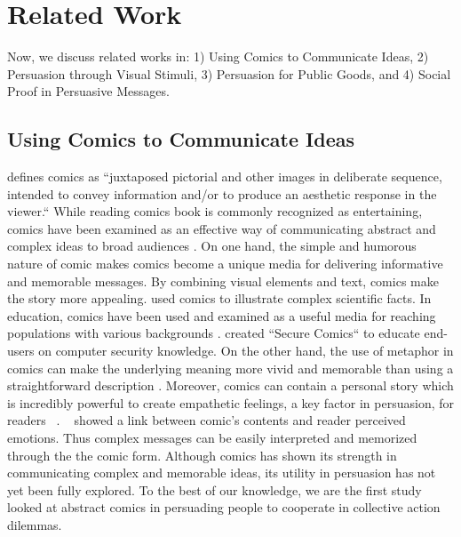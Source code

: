 \section{Related Work}
\label{sec:relatedwork}
Now, we discuss related works in: 1) Using Comics to Communicate Ideas, 2) Persuasion through Visual Stimuli, 3) Persuasion for Public Goods, and 4) Social Proof in Persuasive Messages.

\subsection{Using Comics to Communicate Ideas}
\textcite{scott1993understanding} defines comics as ``juxtaposed pictorial and other images in deliberate sequence, intended to convey information and/or to produce an aesthetic response in the viewer.`` While reading comics book is commonly recognized as entertaining, comics have been examined as an effective way of communicating abstract and complex ideas to broad audiences \cite{McDermottPB18,cary2004going,scott1993understanding, Zhang-Kennedy:2017:SCI:3206217.3206282}. On one hand, the simple and humorous nature of comic makes comics become a unique media for delivering informative and memorable messages. By combining visual elements and text, comics make the story more appealing. \textcite{McDermottPB18} used comics to illustrate complex scientific facts. In education, comics have been used and examined as a useful media for reaching populations with various backgrounds \cite{McDermottPB18,cary2004going,scott1993understanding}. \textcite{Zhang-Kennedy:2017:SCI:3206217.3206282} created ``Secure Comics`` to educate end-users on computer security knowledge. On the other hand, the use of metaphor in comics can make the underlying meaning more vivid and memorable than using a straightforward description \cite{McDermottPB18,scott1993understanding}. Moreover, comics can contain a personal story which is incredibly powerful to create empathetic feelings, a key factor in persuasion, for readers ~\cite{weaver2017losing}. ~\textcite{matsubara2016emotional} showed a link between  comic's contents and reader perceived emotions. Thus complex messages can be easily interpreted and memorized through the the comic form. Although comics has shown its strength in communicating complex and memorable ideas, its utility in persuasion has not yet been fully explored. To the best of our knowledge, we are the first study looked at abstract comics in persuading people to cooperate in collective action dilemmas.  

